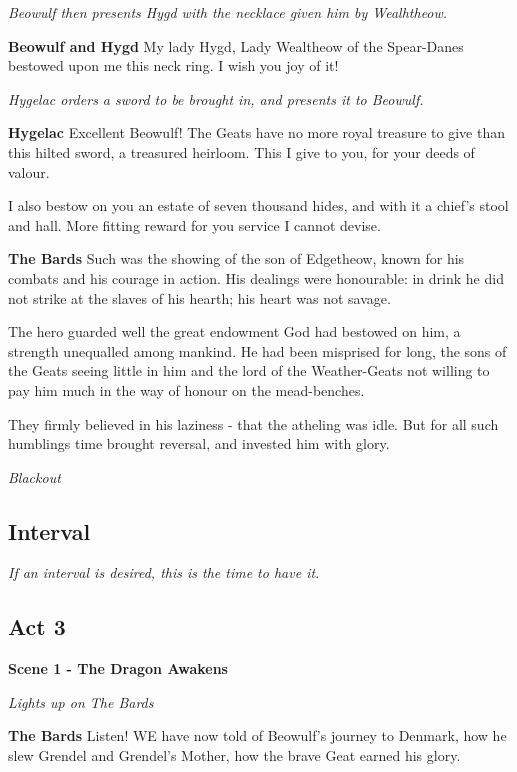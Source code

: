 \documentclass[a4paper]{article}
\begin{document}
{\centerline{\textit{Beowulf then presents Hygd with the necklace given him by Wealhtheow.}}

\textbf{Beowulf and Hygd} My lady Hygd,
Lady Wealtheow of the Spear-Danes 
bestowed upon me this neck ring. 
I wish you joy of it!

\centerline{\textit{Hygelac orders a sword to be brought in, and presents it to Beowulf.}}

\textbf{Hygelac} Excellent Beowulf!
The Geats have no more royal treasure to give
than this hilted sword, a treasured heirloom.
This I give to you, for your deeds of valour.

I also bestow on you an estate of seven thousand hides,
and with it a chief's stool and hall. 
More fitting reward for you service I cannot devise.

\textbf{The Bards} Such was the showing of the son of Edgetheow,
known for his combats and his courage in action.
His dealings were honourable: in drink he did not strike
at the slaves of his hearth; his heart was not savage.

The hero guarded well the great endowment
God had bestowed on him, a strength unequalled
among mankind. He had been misprised for long,
the sons of the Geats seeing little in him
and the lord of the Weather-Geats not willing to pay him
much in the way of honour on the mead-benches.

They firmly believed in his laziness - 
that the atheling was idle.
But for all such humblings
time brought reversal, and invested him with glory.

\centerline{\textit{Blackout}}

\subsection{Interval}%

\centerline{\textit{If an interval is desired, this is the time to have it.}}

\subsection{Act 3}%

\centerline{\textbf{Scene 1 - The Dragon Awakens}}
\centerline{\textit{Lights up on The Bards}}

\textbf{The Bards}  Listen!
WE have now told of Beowulf's journey to Denmark,
how he slew Grendel and Grendel's Mother,
how the brave Geat earned his glory.

}
\end{document}
